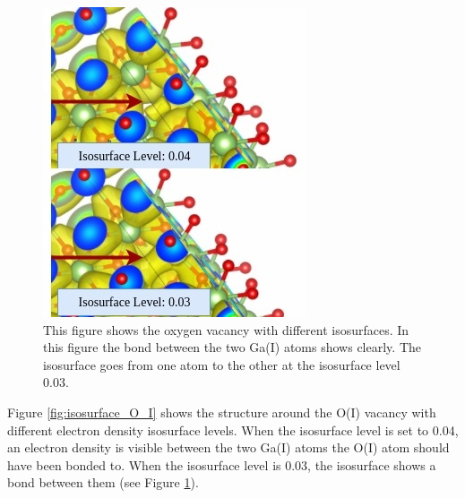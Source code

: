 \begin{figure}[H]
\includegraphics[width=0.7\linewidth]{../fig/isosurfaces/O_I/bond}\caption{This figure shows the oxygen vacancy with different isosurfaces. In this figure the bond between the two Ga(I) atoms shows clearly. The isosurface goes from one atom to the other at the isosurface level 0.03.}\label{fig:bond_O_I}
\end{figure}

Figure \ref{fig:isosurface_O_I} shows the structure around the O(I) vacancy with different electron density isosurface levels. When the isosurface level is set to 0.04, an electron density is visible between the two Ga(I) atoms the O(I) atom should have been bonded to. When the isosurface level is 0.03, the isosurface shows a bond between them (see Figure \ref{fig:bond_O_I}).

